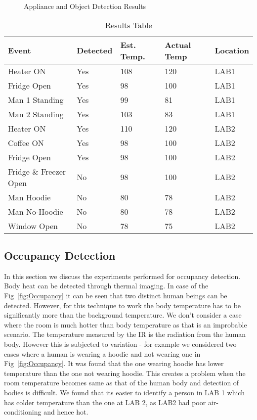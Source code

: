  \begin{figure}[!ht]
 	\label{fig:Object Detection}
 	\caption{Appliance and Object Detection Results}
 \end{figure}
    
    \begin{table}[h!]
    	\centering
    	\begin{tabular}{||p{1.8cm} | p{1.2cm} | p{1.2cm}| p{1cm} | p{1cm}||}
    		\hline
    		Event & Detected & Est. Temp. & Actual Temp & Location\\ [0.5ex]
    		\hline\hline
    			Heater ON  & Yes & 108 &  120 & LAB1\\
    			\hline
    			 Fridge Open  & Yes & 98 &  100 & LAB1\\
    			 \hline
    			 Man 1 Standing  & Yes & 99 &  81 & LAB1\\
    			\hline
    				 Man 2 Standing  & Yes & 103 &  83  & LAB1\\
    				 \hline
    		 Heater ON  & Yes & 110 &  120 & LAB2\\
    		\hline
		     Coffee ON  & Yes & 98 &  100 & LAB2\\
    		\hline
    		 Fridge Open  & Yes & 98 &  100 & LAB2\\
    		\hline
    		Fridge \& Freezer Open  & No & 98 &  100 & LAB2\\
    		\hline
    		Man Hoodie  & No & 80 &  78 & LAB2\\
    		\hline
    		Man No-Hoodie & No & 80 &  78 & LAB2\\
    		\hline
    		Window Open & No & 78 &  75 & LAB2\\
    		\hline\hline
     	\end{tabular}
    	\label{table:DetectionTable}
    	\caption{Results Table}
    \end{table}
    
    
     \subsection{Occupancy Detection} In this section we discuss the experiments performed for occupancy detection. Body heat can be detected through thermal imaging. In case of the Fig~\ref{fig:Occupancy} it can be seen that two distinct human beings can be detected. However, for this technique to work the body temperature has to be significantly more than the background temperature. We don't consider a case where the room is much hotter than body temperature as that is an improbable scenario. The temperature measured by the IR is the radiation from the human body. However this is subjected to variation - for example we considered two cases where a human is wearing a hoodie and not wearing one in Fig~\ref{fig:Occupancy}. It was found that the one wearing hoodie has lower temperature than the one not wearing hoodie. This creates a problem when the room temperature becomes same as that of the human body and detection of bodies is difficult. We found that its easier to identify a person in LAB 1 which has colder temperature than the one at LAB 2, as LAB2 had poor air-conditioning and hence hot. 


